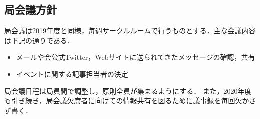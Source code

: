 \subsection*{局会議方針}


局会議は2019年度と同様，毎週サークルルームで行うものとする．主な会議内容は下記の通りである．
\begin{itemize}
  \item メールや会公式Twitter，Webサイトに送られてきたメッセージの確認，共有
  \item イベントに関する記事担当者の決定
\end{itemize}

局会議日程は局員間で調整し，原則全員が集まるようにする．
また，2020年度も引き続き，局会議欠席者に向けての情報共有を図るために議事録を毎回欠かさず書く．


